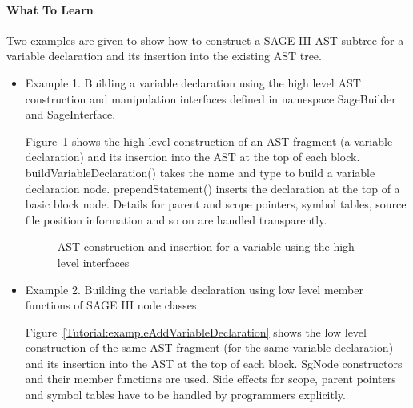\paragraph{What To Learn} Two examples are given to show how to construct a SAGE III 
AST subtree for a variable declaration and its insertion into the existing AST tree.
\begin{itemize}
\item Example 1. Building a variable declaration using the high level AST construction and 
manipulation interfaces defined in namespace SageBuilder and SageInterface. 

Figure~\ref{Tutorial:exampleAddVariableDeclaration2} shows the high level
construction of an AST fragment (a variable declaration) and its insertion 
into the AST at the top of each block. buildVariableDeclaration() takes the name and type
to build a variable declaration node. prependStatement() inserts the declaration at the top
of a basic block node. Details for parent and scope pointers, symbol
tables, source file position information 
and so on are handled transparently.

\begin{figure}[!hbp]
{\indent
{\mySmallFontSize
\begin{latexonly}
   
\end{latexonly}

\begin{htmlonly}
   
\end{htmlonly}

}
}
\caption{AST construction and insertion for a variable using the high level interfaces}
\label{Tutorial:exampleAddVariableDeclaration2}
\end{figure}


\item
Example 2. Building the variable declaration using low level member functions of SAGE III node classes.

Figure~\ref{Tutorial:exampleAddVariableDeclaration} shows the low level
construction of the same AST fragment (for the same variable declaration) and its insertion 
into the AST at the top of each block. SgNode constructors and their member functions are used.
Side effects for scope, parent pointers and symbol tables have to be handled by programmers explicitly.


\end{itemize}
